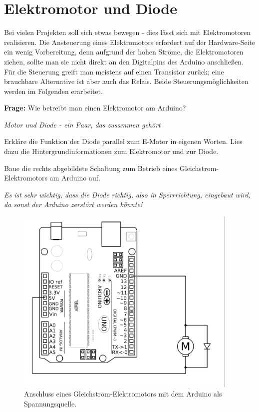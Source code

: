 \newpage
\section{Elektromotor und Diode}\label{sec:motoren}

Bei vielen Projekten soll sich etwas bewegen - dies lässt sich mit Elektromotoren realisieren. Die Ansteuerung eines Elektromotors erfordert auf der Hardware-Seite ein wenig Vorbereitung, denn aufgrund der hohen Ströme, die Elektromotoren ziehen, sollte man sie nicht direkt an den Digitalpins des Arduino anschließen. Für die Steuerung greift man meistens auf einen Transistor zurück; eine brauchbare Alternative ist aber auch das Relais. Beide Steuerungsmöglichkeiten werden im Folgenden erarbeitet.

\begin{ziel}
	\textbf{Frage:} Wie betreibt man einen Elektromotor am Arduino?
\end{ziel}
\medskip
\begin{minipage}[t]{0.5\textwidth}
	\begin{aufgabe} \emph{Motor und Diode - ein Paar, das zusammen gehört}
		
		Erkläre die Funktion der Diode parallel zum E-Motor in eigenen Worten. Lies dazu die Hintergrundinformationen zum Elektromotor und zur Diode.
		
		\smallskip
		Baue die rechts abgebildete Schaltung zum Betrieb eines Gleichstrom-Elektromotors am Arduino auf.
		
		\bigskip
		\ausrufezeichen \emph{Es ist sehr wichtig, dass die Diode richtig, also in Sperrrichtung, eingebaut wird, da sonst der Arduino zerstört werden könnte!}
	\end{aufgabe}
\end{minipage}
\hfill
\begin{minipage}[t]{0.45\textwidth}
	\begin{figure}[H]
		\centering
		\includegraphics[width=0.95\textwidth]{./Zeichnungen/Schaltplan-Motoranschluss-einfach.png}
		\caption{Anschluss eines Gleichstrom-Elektromotors mit dem Arduino als Spannungsquelle.}
	\end{figure}
\end{minipage}
\medskip

